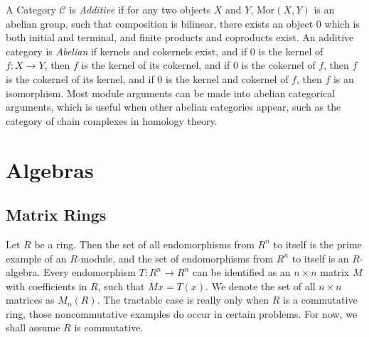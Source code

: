 A Category $\mathcal{C}$ is \emph{Additive} if for any two objects $X$ and $Y$, $\text{Mor}(X,Y)$ is an abelian group, such that composition is bilinear, there exists an object $0$ which is both initial and terminal, and finite products and coproducts exist. An additive category is \emph{Abelian} if kernels and cokernels exist, and if $0$ is the kernel of $f: X \to Y$, then $f$ is the kernel of its cokernel, and if $0$ is the cokernel of $f$, then $f$ is the cokernel of its kernel, and if $0$ is the kernel and cokernel of $f$, then $f$ is an isomorphism. Most module arguments can be made into abelian categorical arguments, which is useful when other abelian categories appear, such as the category of chain complexes in homology theory.

\chapter{Algebras}

\section{Matrix Rings}

Let $R$ be a ring. Then the set of all endomorphisms from $R^n$ to itself is the prime example of an $R$-module, and the set of endomorphisms from $R^n$ to itself is an $R$-algebra. Every endomorphism $T:R^n \to R^n$ can be identified as an $n \times n$ matrix $M$ with coefficients in $R$, such that $Mx = T(x)$. We denote the set of all $n \times n$ matrices as $M_n(R)$. The tractable case is really only when $R$ is a commutative ring, those noncommutative examples do occur in certain problems. For now, we shall assume $R$ is commutative.

